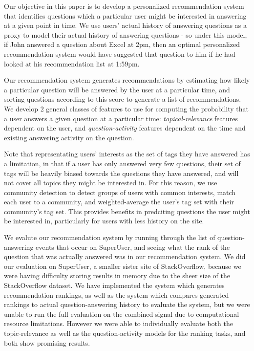 \documentclass[a4paper]{article}
\begin{document}
Our objective in this paper is to develop a personalized recommendation system that identifies questions which a particular user might be interested in answering at a given point in time. We use users' actual history of answering questions as a proxy to model their actual history of answering questions - so under this model, if John answered a question about Excel at 2pm, then an optimal personalized recommendation system would have suggested that question to him if he had looked at his recommendation list at 1:59pm.

Our recommendation system generates recommendations by estimating how likely a particular question will be answered by the user at a particular time, and sorting questions according to this score to generate a list of recommendations. We develop 2 general classes of features to use for computing the probability that a user answers a given question at a particular time: \emph{topical-relevance} features dependent on the user, and \emph{question-activity} features dependent on the time and existing answering activity on the question.

Note that representating users' interests as the set of tags they have answered has a limitation, in that if a user has only answered very few questions, their set of tags will be heavily biased towards the questions they have answered, and will not cover all topics they might be interested in. For this reason, we use community detection to detect groups of users with common interests, match each user to a community, and weighted-average the user's tag set with their community's tag set. This provides benefits in predciting questions the user might be interested in, particularly for users with less history on the site.

We evalute our  recommendation system by running through the list of question-answering events that occur on SuperUser, and seeing what the rank of the question that was actually answered was in our recommendation system. We did our evaluation on SuperUser, a smaller sister site of StackOverflow, because we were having difficulty storing results in memory due to the sheer size of the StackOverflow dataset.
We have implemented the system which generates recommendation rankings, as well as the system which compares generated rankings to actual question-answering history to evaluate the system, but we were unable to run the full evaluation on the combined signal due to computational resource limitations. However we were able to individually evaluate both the topic-relevance as well as the question-activity models for the ranking tasks, and both show promising results.
\end{document}
